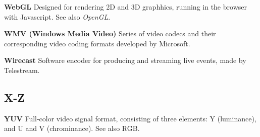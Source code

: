 \smallskip
\textbf{WebGL}
Designed for rendering 2D and 3D graphhics, running in the browser with Javascript. See also \textit{OpenGL}.

\smallskip
\textbf{WMV (Windows Media Video)}
Series of video codecs and their corresponding video coding formats developed by Microsoft.

\smallskip
\textbf{Wirecast}
Software encoder for producing and streaming live events, made by Telestream.

\subsection{X-Z}

\smallskip
\textbf{YUV}
Full-color video signal format, consisting of three elements: Y (luminance), and U and V (chrominance). See also RGB.
